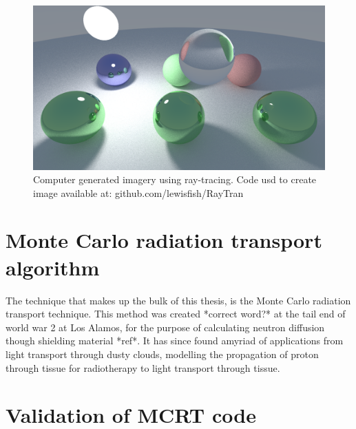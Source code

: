 \begin{figure}
\centering
\includegraphics[width=\columnwidth]{./MCRT/images/ray-tracing.png}
\caption{Computer generated imagery using ray-tracing. Code usd to create image available at: github.com/lewisfish/RayTran}
\label{fig:ray-trace}
\end{figure}

\section{Monte Carlo radiation transport algorithm}

The technique that makes up the bulk of this thesis, is the Monte Carlo radiation transport technique. This method was created *correct word?* at the tail end of world war 2 at Los Alamos, for the purpose of calculating neutron diffusion though shielding material *ref*. It has since found amyriad of applications from light transport through dusty clouds, modelling the propagation of proton through tissue for radiotherapy to light transport through tissue.

\section{Validation of MCRT code}
